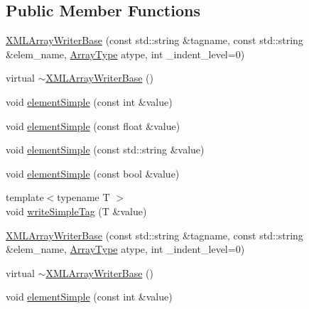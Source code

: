 \subsection*{Public Member Functions}
\begin{DoxyCompactItemize}
\item 
\mbox{\hyperlink{classXMLStructWriterAPI_1_1XMLArrayWriterBase_a0df8629240d895664bd6e2dce1b53691}{X\+M\+L\+Array\+Writer\+Base}} (const std\+::string \&tagname, const std\+::string \&elem\+\_\+name, \mbox{\hyperlink{namespaceXMLStructWriterAPI_a2017208be87c77a32bdc19ea2f14d032}{Array\+Type}} atype, int \+\_\+indent\+\_\+level=0)
\item 
virtual \mbox{\hyperlink{classXMLStructWriterAPI_1_1XMLArrayWriterBase_accb141c8e382b112256e15dec7499b7f}{$\sim$\+X\+M\+L\+Array\+Writer\+Base}} ()
\item 
void \mbox{\hyperlink{classXMLStructWriterAPI_1_1XMLArrayWriterBase_a4523996304d9e9468147d12602257364}{element\+Simple}} (const int \&value)
\item 
void \mbox{\hyperlink{classXMLStructWriterAPI_1_1XMLArrayWriterBase_a7bb84df43c22d343c2006f1561ea3133}{element\+Simple}} (const float \&value)
\item 
void \mbox{\hyperlink{classXMLStructWriterAPI_1_1XMLArrayWriterBase_a1ec9aad9885d357f65462b5d4a7cf593}{element\+Simple}} (const std\+::string \&value)
\item 
void \mbox{\hyperlink{classXMLStructWriterAPI_1_1XMLArrayWriterBase_a69c66b868b51c45555aca1c5f857710e}{element\+Simple}} (const bool \&value)
\item 
{\footnotesize template$<$typename T $>$ }\\void \mbox{\hyperlink{classXMLStructWriterAPI_1_1XMLArrayWriterBase_a7c0092991561b5000ae55724cdc3d062}{write\+Simple\+Tag}} (T \&value)
\item 
\mbox{\hyperlink{classXMLStructWriterAPI_1_1XMLArrayWriterBase_a0df8629240d895664bd6e2dce1b53691}{X\+M\+L\+Array\+Writer\+Base}} (const std\+::string \&tagname, const std\+::string \&elem\+\_\+name, \mbox{\hyperlink{namespaceXMLStructWriterAPI_a2017208be87c77a32bdc19ea2f14d032}{Array\+Type}} atype, int \+\_\+indent\+\_\+level=0)
\item 
virtual \mbox{\hyperlink{classXMLStructWriterAPI_1_1XMLArrayWriterBase_accb141c8e382b112256e15dec7499b7f}{$\sim$\+X\+M\+L\+Array\+Writer\+Base}} ()
\item 
void \mbox{\hyperlink{classXMLStructWriterAPI_1_1XMLArrayWriterBase_a4523996304d9e9468147d12602257364}{element\+Simple}} (const int \&value)

\end{DoxyCompactItemize}
